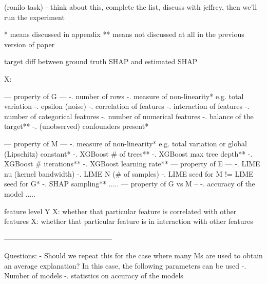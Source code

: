 (ronilo task) - think about this, complete the list, discuss with jeffrey, then we'll run the experiment

* means discussed in appendix
** means not discussed at all in the previous version of paper

target
diff between ground truth SHAP and estimated SHAP



X:

--- property of G ---
-. number of rows
-. measure of non-linearity* e.g. total variation 
-. epsilon (noise)
-. correlation of features
-. interaction of features
-. number of categorical features
-. number of numerical features
-. balance of the target**
-. (unobserved) confounders present*

--- property of M ---
-. measure of non-linearity* e.g. total variation or global (Lipschitz) constant*
-. XGBoost # of trees**
-. XGBoost max tree depth**
-. XGBoost # iterations**
-. XGBoost learning rate**
--- property of E ---
-. LIME nu (kernel bandwidth)
-. LIME N (# of samples)
-. LIME seed for M != LIME seed for G*
-. SHAP sampling**
.....
--- property of G vs M --
-. accuracy of the model
.....

feature level Y
X: whether that particular feature is correlated with other features
X: whether that particular feature is in interaction with other features

---------------------------------------------

Questions: 
- Should we repeat this for the case where many Ms are used to obtain an average explanation?
In this case, the following parameters can be used
-. Number of models
-. statistics on accuracy of the models
